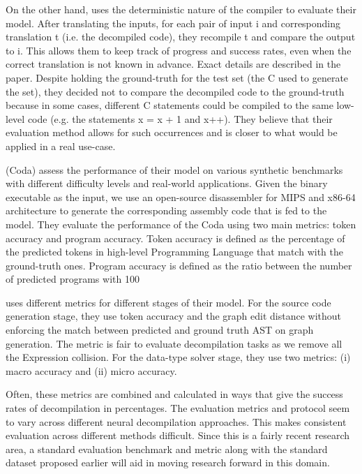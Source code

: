 \documentclass{article}
\begin{document}
On the other hand, \citet{katz2019towards} uses the deterministic nature of the compiler to evaluate their model. After translating the inputs, for each pair of input i and corresponding translation t (i.e. the decompiled code), they recompile t and compare the output to i. This allows them to keep track of progress and success rates, even when the correct translation is not known in advance. Exact details are described in the paper. Despite holding the ground-truth for the test set (the C used to generate the set), they decided not to compare the decompiled code to the ground-truth because in some cases, different C statements could be compiled to the same low-level code (e.g. the statements x = x + 1 and x++). They believe that their evaluation method allows for such occurrences and is closer to what would be applied in a real use-case.

\citet{coda} (Coda) assess the performance of their model on various synthetic benchmarks with different difficulty levels and real-world applications. Given the binary executable as the input, we use an open-source disassembler \cite{mips,redasm} for MIPS \cite{hennessy1982mips} and x86-64 \cite{guide2011intel} architecture to generate the corresponding assembly code that is fed to the model. They evaluate the performance of the Coda using two main metrics: token accuracy and program accuracy. Token accuracy is defined as the percentage of the predicted tokens in high-level Programming Language that match with the ground-truth ones. Program accuracy is defined as the ratio between the number of predicted programs with 100%

\cite{nbref} uses different metrics for different stages of their model. For the source code generation stage, they use token accuracy and the graph edit distance \cite{sanfeliu1983distance} without enforcing the match between predicted and ground truth AST on graph generation. The metric is fair to evaluate decompilation tasks as we remove all the Expression collision. For the data-type solver stage, they use two metrics: (i) macro accuracy and (ii) micro accuracy.

Often, these metrics are combined and calculated in ways that give the success rates of decompilation in percentages. The evaluation metrics and protocol seem to vary across different neural decompilation approaches. This makes consistent evaluation across different methods difficult. Since this is a fairly recent research area, a standard evaluation benchmark and metric along with the standard dataset proposed earlier will aid in moving research forward in this domain.
\end{document}
